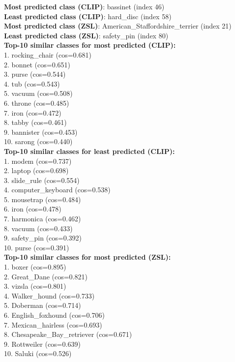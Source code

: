 
\textbf{Most predicted class (CLIP)}: bassinet (index 46)\\
\textbf{Least predicted class (CLIP)}: hard_disc (index 58)\\

\textbf{Most predicted class (ZSL)}: American_Staffordshire_terrier (index 21)\\
\textbf{Least predicted class (ZSL)}: safety_pin (index 80)\\

\textbf{Top-10 similar classes for most predicted (CLIP):}\\
1. rocking_chair (cos=0.681)\\
2. bonnet (cos=0.651)\\
3. purse (cos=0.544)\\
4. tub (cos=0.543)\\
5. vacuum (cos=0.508)\\
6. throne (cos=0.485)\\
7. iron (cos=0.472)\\
8. tabby (cos=0.461)\\
9. bannister (cos=0.453)\\
10. sarong (cos=0.440)\\

\textbf{Top-10 similar classes for least predicted (CLIP):}\\
1. modem (cos=0.737)\\
2. laptop (cos=0.698)\\
3. slide_rule (cos=0.554)\\
4. computer_keyboard (cos=0.538)\\
5. mousetrap (cos=0.484)\\
6. iron (cos=0.478)\\
7. harmonica (cos=0.462)\\
8. vacuum (cos=0.433)\\
9. safety_pin (cos=0.392)\\
10. purse (cos=0.391)\\

\textbf{Top-10 similar classes for most predicted (ZSL):}\\
1. boxer (cos=0.895)\\
2. Great_Dane (cos=0.821)\\
3. vizsla (cos=0.801)\\
4. Walker_hound (cos=0.733)\\
5. Doberman (cos=0.714)\\
6. English_foxhound (cos=0.706)\\
7. Mexican_hairless (cos=0.693)\\
8. Chesapeake_Bay_retriever (cos=0.671)\\
9. Rottweiler (cos=0.639)\\
10. Saluki (cos=0.526)\\

